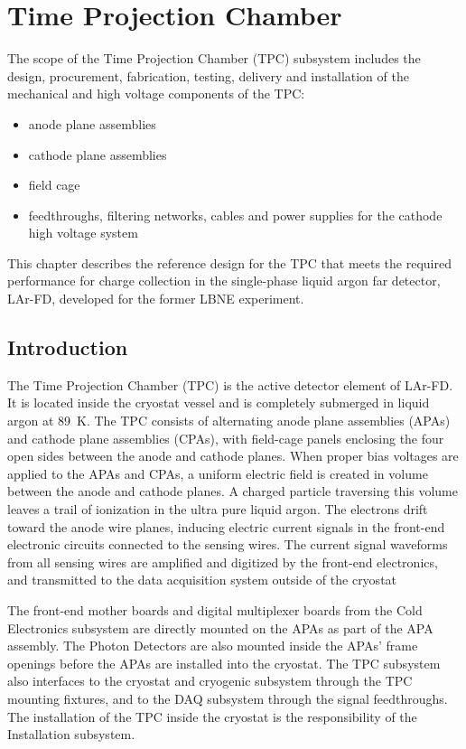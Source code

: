 \chapter{Time Projection Chamber}
\label{ch:tpc}

The scope of the Time Projection Chamber (TPC) subsystem includes the design, procurement, fabrication, testing, delivery and installation of the mechanical and high voltage components of the TPC: 
\begin{itemize}
\item anode plane assemblies 
\item cathode plane assemblies
\item field cage
\item feedthroughs, filtering networks, cables and power supplies for the cathode high voltage system
\end{itemize}
This chapter describes the reference design for the TPC that meets the required performance for charge 
collection in the single-phase liquid argon far detector, LAr-FD, developed for the former LBNE experiment.

\section{Introduction}

The Time Projection Chamber (TPC) is the active detector element of LAr-FD. It is located inside the cryostat 
vessel and is completely submerged in liquid argon at 89~K. The TPC consists of alternating anode plane 
assemblies (APAs) and cathode plane assemblies (CPAs), with field-cage panels enclosing the four open sides between the anode and cathode planes.
When proper bias voltages are applied to the APAs and CPAs, a uniform electric field is created in volume between the anode and cathode planes. A charged particle traversing this volume leaves a trail of 
ionization in the ultra pure liquid argon.  The electrons drift toward the anode wire planes, inducing electric current signals in the front-end electronic circuits connected to the sensing wires.  The current 
signal waveforms from all sensing wires are amplified and digitized by the front-end electronics, and transmitted to the data acquisition system outside of the cryostat

The front-end mother boards and digital multiplexer boards from the Cold Electronics subsystem are directly mounted on the APAs as part of the APA assembly.  The Photon Detectors are also mounted 
inside the APAs' frame openings before the APAs are installed into the cryostat. The TPC subsystem also interfaces to the cryostat and cryogenic subsystem through the TPC mounting fixtures, and to the DAQ 
subsystem through the signal feedthroughs.  The installation of the TPC inside the cryostat is the responsibility of the Installation subsystem.


